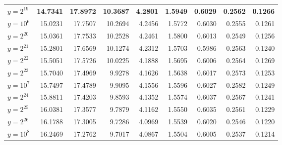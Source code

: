 \documentclass{article}
\theoremstyle{definition}
\begin{document}
\begin{table}[h!]
\begin{tabular}{l | rrrrrrrr}
        $y = 2^{19}$  & 14.7341 & 17.8972               & 10.3687               & 4.2801                & 1.5949                & 0.6029                & 0.2562                & 0.1266                \\
        \hline
        $y = 10^{6}$  & 15.0231 & 17.7507               & 10.2694               & 4.2456                & 1.5772                & 0.6030                & 0.2555                & 0.1261                \\
        \hline
        $y = 2^{20}$  & 15.0361 & 17.7533               & 10.2528               & 4.2461                & 1.5800                & 0.6013                & 0.2549                & 0.1256                \\
        $y = 2^{21}$  & 15.2801 & 17.6569               & 10.1274               & 4.2312                & 1.5703                & 0.5986                & 0.2563                & 0.1240                \\
        $y = 2^{22}$  & 15.5051 & 17.5726               & 10.0225               & 4.1888                & 1.5695                & 0.6006                & 0.2564                & 0.1269                \\
        $y = 2^{23}$  & 15.7040 & 17.4969               & 9.9278                & 4.1626                & 1.5638                & 0.6017                & 0.2573                & 0.1253                \\
        \hline
        $y = 10^{7}$  & 15.7497 & 17.4789               & 9.9095                & 4.1556                & 1.5596                & 0.6027                & 0.2582                & 0.1249                \\
        \hline
        $y = 2^{24}$  & 15.8811 & 17.4203               & 9.8593                & 4.1352                & 1.5574                & 0.6037                & 0.2567                & 0.1241                \\
        $y = 2^{25}$  & 16.0381 & 17.3577               & 9.7879                & 4.1162                & 1.5550                & 0.6035                & 0.2561                & 0.1229                \\
        $y = 2^{26}$  & 16.1788 & 17.3005               & 9.7286                & 4.0969                & 1.5539                & 0.6020                & 0.2546                & 0.1220                \\
        \hline
        $y = 10^{8}$  & 16.2469 & 17.2762               & 9.7017                & 4.0867                & 1.5504                & 0.6005                & 0.2537                & 0.1214                \\

\end{tabular}
\end{table}
\end{document}
